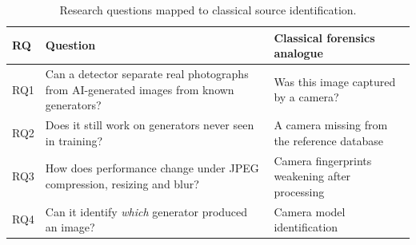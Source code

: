 \documentclass{mnnit}
\begin{document}
\begin{table}[htbp]
\centering
\caption{Research questions mapped to classical source identification.}
\label{tab:rq}
\small
\begin{tabular}{p{0.8cm}p{6.3cm}p{5.5cm}}
\toprule
\textbf{RQ} & \textbf{Question} & \textbf{Classical forensics analogue}\\
\midrule
RQ1 & Can a detector separate real photographs from AI-generated images from known generators? & Was this image captured by a camera?\\
RQ2 & Does it still work on generators never seen in training? & A camera missing from the reference database\\
RQ3 & How does performance change under JPEG compression, resizing and blur? & Camera fingerprints weakening after processing\\
RQ4 & Can it identify \emph{which} generator produced an image? & Camera model identification\\
\bottomrule
\end{tabular}
\end{table}
\end{document}
